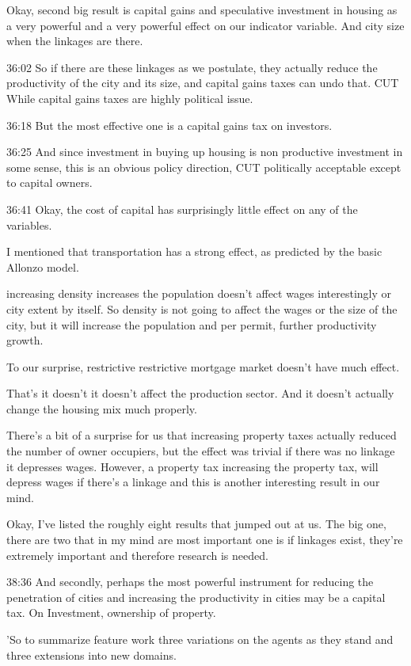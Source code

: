 Okay, second big result is capital gains and speculative investment in housing as a very powerful and a very powerful effect on our indicator variable. And city size when the linkages are there.

36:02
So if there are these linkages as we postulate, they actually reduce the productivity of the city and its size, and capital gains taxes can undo that. CUT While capital gains taxes are highly political issue.

36:18
But the most effective one is a capital gains tax on investors.

36:25
And since investment in buying up housing is non productive investment in some sense, this is an obvious policy direction, CUT politically acceptable except to capital owners.

36:41
Okay, the cost of capital has surprisingly little effect on any of the variables. 

I mentioned that transportation has a strong effect, as predicted by the basic Allonzo model. 

increasing density increases the population doesn't affect wages interestingly or city extent by itself. So density is not going to affect the wages or the size of the city, but it will increase the population and per permit, further productivity growth.


To our surprise, restrictive restrictive mortgage market doesn't have much effect.

That's it doesn't it doesn't affect the production sector. And it doesn't actually change the housing mix much properly. 

There's a bit of a surprise for us that increasing property taxes actually reduced the number of owner occupiers, but the effect was trivial if there was no linkage it depresses wages. However, a property tax increasing the property tax, will depress wages if there's a linkage and this is another interesting result in our mind. 

Okay, I've listed the roughly eight results that jumped out at us. The big one, there are two that in my mind are most important one is if linkages exist, they're extremely important and therefore research is needed.

38:36
And secondly, perhaps the most powerful instrument for reducing the penetration of cities and increasing the productivity in cities may be a capital tax. On Investment, ownership of property.

'So to summarize feature work three variations on the agents as they stand and three extensions into new domains. 

